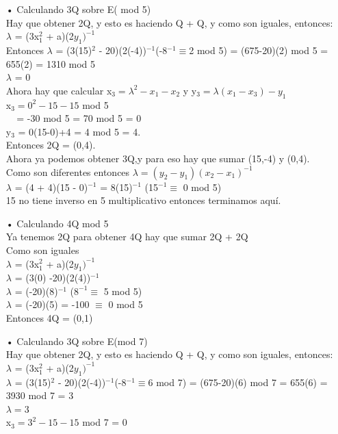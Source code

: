 \documentclass[10pt,a4paper]{article}
\begin{document}
\begin{enumerate}
\begin{itemize}
\begin{itemize}
\item[•] Calculando 3Q sobre E( mod 5)
\\Hay que obtener 2Q, y esto es haciendo Q + Q, y como son iguales, entonces:\\ $\lambda$ = (3x$_{1}^{2}$ + a)(2$y_{1})^{-1}$ 
\\Entonces $\lambda$ = (3(15)$^{2}$ - 20)(2(-4))$^{-1}$(-8$^{-1} \equiv $2 mod 5) = (675-20)(2) mod 5 = 655(2) = 1310 mod 5\\
$\lambda$ = 0 \\
Ahora hay que calcular x$_{3} = \lambda ^{2}- x_{1}- x_{2}$ y y$_{3} = \lambda(x_{1} - x_{3})-y_{1}$
\\x$_{3} = 0^{2}-15-15$ mod 5 
\\$~~~~~$= -30 mod 5 = 70 mod 5 = 0
\\y$_{3}$ = 0(15-0)+4 = 4 mod 5 = 4.
\\Entonces 2Q = (0,4).
\\Ahora ya podemos obtener 3Q,y para eso hay que sumar (15,-4) y (0,4).
\\Como son diferentes entonces $\lambda = (y_{2} - y_{1})(x_{2} - x_{1})^{-1}$
\\$\lambda$ = (4 + 4)(15 - 0)$^{-1}$ = 8(15)$^{-1}$ (15$^{-1} \equiv$ 0 mod 5) 
\\15 no tiene inverso en 5 multiplicativo entonces terminamos aquí.
\item[•] Calculando 4Q mod 5
\\Ya tenemos 2Q para obtener 4Q hay que sumar 2Q + 2Q 
\\Como son iguales 
\\$\lambda$ = (3x$_{1}^{2}$ + a)(2$y_{1})^{-1}$
\\$\lambda$ = (3(0) -20)(2(4))$^{-1}$
\\$\lambda$ = (-20)(8)$^{-1}$ ($8^{-1} \equiv$ 5 mod 5)
\\$\lambda$ = (-20)(5) = -100 $\equiv$ 0 mod 5
\\Entonces 4Q = (0,1) 
\item[•] Calculando 3Q sobre E(mod 7)
\\Hay que obtener 2Q, y esto es haciendo Q + Q, y como son iguales, entonces:\\ $\lambda$ = (3x$_{1}^{2}$ + a)(2$y_{1})^{-1}$ 
\\$\lambda$ = (3(15)$^{2}$ - 20)(2(-4))$^{-1}$(-8$^{-1} \equiv $6 mod 7) = (675-20)(6) mod 7 = 655(6) = 3930 mod 7 = 3\\ 
$\lambda = $3
\\x$_{3} = 3^{2}-15-15$ mod 7 = 0

\end{itemize}
\end{itemize}
\end{enumerate}
\end{document}
